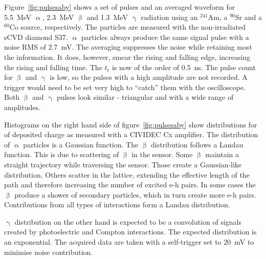 Figure~\ref{fig:pulsesaby} shows a set of pulses and an averaged waveform for 5.5~MeV $\upalpha$, 2.3~MeV $\upbeta$ and 1.3~MeV $\upgamma$ radiation using an $^{241}$Am, a $^{90}$Sr and a $^{60}$Co source, respectively. The particles are measured with the non-irradiated sCVD diamond S37. $\upalpha$ particles always produce the same signal pulse with a noise RMS of 2.7~mV. The averaging suppresses the noise while retaining most the information. It does, however, smear the rising and falling edge, increasing the rising and falling time. The $t_{\mathrm{r}}$ is now of the order of 0.5~ns. The pulse count for $\upbeta$ and $\upgamma$ is low, so the pulses with a high amplitude are not recorded. A trigger would need to be set very high to ``catch'' them with the oscilloscope. Both $\upbeta$ and $\upgamma$ pulses look similar - triangular and with a wide range of amplitudes.

Histograms on the right hand side of figure~\ref{fig:pulsesaby} show distributions for of deposited charge as measured with a CIVIDEC Cx amplifier. The distribution of $\upalpha$ particles is a Gaussian function. The $\upbeta$ distribution follows a Landau function. This is due to scattering of $\upbeta$ in the sensor. Some $\upbeta$ maintain a straight trajectory while traversing the sensor. Those create a Gaussian-like distribution. Others scatter in the lattice, extending the effective length of the path and therefore increasing the number of excited e-h pairs. In some cases the $\upbeta$ produce a shower of secondary particles, which in turn create more e-h pairs. Contributions from all types of interactions form a Landau distribution.

$\upgamma$ distribution on the other hand is expected to be a convolution of signals created by photoelectric and Compton interactions. The expected distribution is an exponential. The acquired data are taken with a self-trigger set to 20~mV to minimise noise contribution. %

